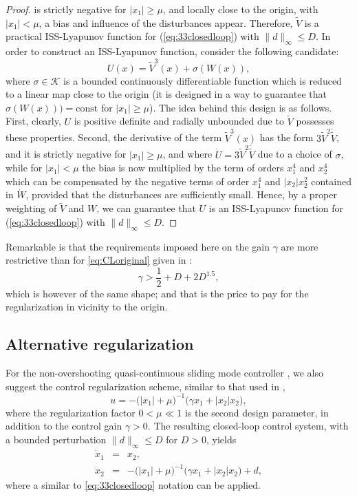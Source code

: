 \documentclass[letterpaper, 10 pt, conference]{ieeeconf}  %
\begin{document}
\begin{proof}
is strictly negative for $|x_{1}|\geq\mu$, and locally close to the
origin, with $|x_{1}|<\mu$, a bias and influence of the disturbances
appear. Therefore, $\tilde{V}$ is a practical ISS-Lyapunov function
for (\ref{eq:33closedloop}) with $\|d\|_{\infty}\leq D$. In order
to construct an ISS-Lyapunov function, consider the following candidate:
\[
U(x)=\tilde{V}^{3}(x)+\sigma(W(x)),
\]
where $\sigma\in\mathcal{K}$ is a bounded continuously differentiable
function which is reduced to a linear map close to the origin (it is designed in a way 
to guarantee that $\sigma(W(x)))=\text{const}$ for $|x_1|\geq\mu$). The
idea behind this design is as follows. First, clearly, $U$ is positive
definite and radially unbounded due to $\tilde{V}$ possesses these
properties. Second, the derivative of the term $\tilde{V}^{3}(x)$
has the form $3\tilde{V}^{2}\dot{\tilde{V}}$, and it is strictly
negative for $|x_{1}|\geq\mu$, and where $\dot{U}=3\tilde{V}^{2}\dot{\tilde{V}}$
due to a choice of $\sigma$, while for $|x_{1}|<\mu$ the bias is
now multiplied by the term of orders $x_{1}^{4}$ and $x_{2}^{4}$
which can be compensated by the negative terms of order $x_{1}^{4}$
and $|x_{2}|x_{2}^{2}$ contained in $\dot{W}$, provided that the
disturbances are sufficiently small. Hence, by a proper weighting
of $\tilde{V}$ and $W$, we can guarantee that $U$ is an ISS-Lyapunov
function for (\ref{eq:33closedloop}) with $\|d\|_{\infty}\leq D$.
\end{proof}
Remarkable is that the requirements imposed here on
the gain $\gamma$ are more restrictive than for \eqref{eq:CLoriginal}
given in \cite{ruderman2024robust}:
\[
\gamma>\frac{1}{2}+D+2D^{1.5},
\]
which is however of the same shape; and that is the price to pay for
the regularization in vicinity to the origin.

\subsection{Alternative regularization}
\label{sec:altreg}

For the non-overshooting quasi-continuous sliding mode controller
\cite{ruderman2024robust}, we also suggest the control regularization
scheme, similar to that used in \cite{ruderman2021convergent}, 
\begin{equation}
u=-\bigl(|x_{1}|+\mu \bigr)^{-1} \bigl(\gamma x_{1} + |x_{2}|x_{2} \bigr),\label{eq:regcontrol}
\end{equation}
where the regularization factor $0<\mu\ll1$ is the second design
parameter, in addition to the control gain $\gamma>0$. The resulting
closed-loop control system, with a bounded perturbation $\|d\|_{\infty}\leq D$
for $D>0$, yields
\begin{eqnarray}
\dot{x}_1 & = & x_2,\label{eq:closedloop}\\
\dot{x}_2 & = & -\bigl(|x_{1}|+\mu \bigr)^{-1}\bigl(\gamma x_{1}+|x_{2}|x_{2}\bigr)+d,\nonumber 
\end{eqnarray}
where a similar to \eqref{eq:33closedloop} notation can be applied.
\end{document}
